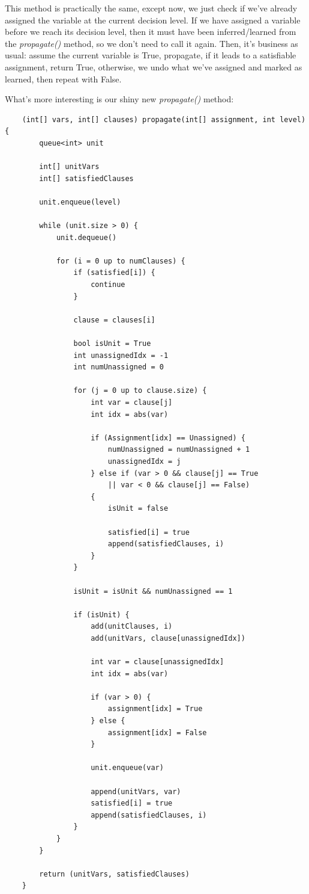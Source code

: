 \documentclass[../main.tex]{subfiles}
\begin{document}
This method is practically the same, except now, we just check if we've already assigned 
the variable at the current decision level. If we have assigned a variable before we reach 
its decision level, then it must have been inferred/learned from the \textit{propagate()} 
method, so we don't need to call it again. Then, it's business as usual: assume the 
current variable is True, propagate, if it leads to a satisfiable assignment, return True, 
otherwise, we undo what we've assigned and marked as learned, then repeat with False. 

What's more interesting is our shiny new \textit{propagate()} method:

\begin{lstlisting}
    (int[] vars, int[] clauses) propagate(int[] assignment, int level) {
        queue<int> unit

        int[] unitVars
        int[] satisfiedClauses 

        unit.enqueue(level)

        while (unit.size > 0) {
            unit.dequeue()

            for (i = 0 up to numClauses) {
                if (satisfied[i]) {
                    continue
                }

                clause = clauses[i]

                bool isUnit = True
                int unassignedIdx = -1
                int numUnassigned = 0

                for (j = 0 up to clause.size) {
                    int var = clause[j]
                    int idx = abs(var)

                    if (Assignment[idx] == Unassigned) {
                        numUnassigned = numUnassigned + 1
                        unassignedIdx = j
                    } else if (var > 0 && clause[j] == True 
                        || var < 0 && clause[j] == False)
                    {
                        isUnit = false

                        satisfied[i] = true
                        append(satisfiedClauses, i)
                    }
                }

                isUnit = isUnit && numUnassigned == 1

                if (isUnit) {
                    add(unitClauses, i)
                    add(unitVars, clause[unassignedIdx])

                    int var = clause[unassignedIdx]
                    int idx = abs(var)

                    if (var > 0) {
                        assignment[idx] = True
                    } else {
                        assignment[idx] = False
                    }

                    unit.enqueue(var)

                    append(unitVars, var)
                    satisfied[i] = true
                    append(satisfiedClauses, i)
                }
            }
        }

        return (unitVars, satisfiedClauses)
    }
\end{lstlisting}
\end{document}
